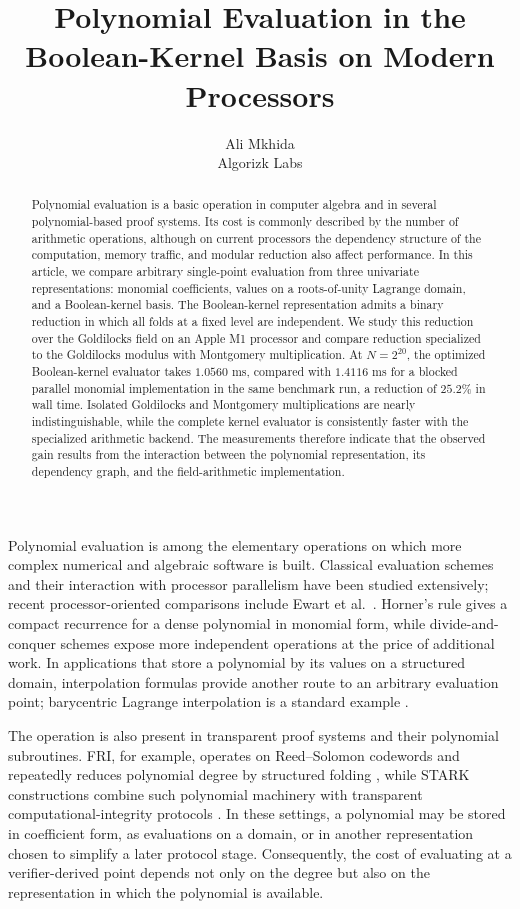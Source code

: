 \documentclass[11pt]{article}
\title{Polynomial Evaluation in the Boolean-Kernel Basis on Modern Processors}
\author{Ali Mkhida\\Algorizk Labs}
\date{}
\begin{document}
\maketitle

\begin{abstract}
Polynomial evaluation is a basic operation in computer algebra and in
several polynomial-based proof systems.  Its cost is commonly described by
the number of arithmetic operations, although on current processors the
dependency structure of the computation, memory traffic, and modular
reduction also affect performance.  In this article, we compare arbitrary
single-point evaluation from three univariate representations: monomial
coefficients, values on a roots-of-unity Lagrange domain, and a
Boolean-kernel basis.  The Boolean-kernel representation admits a binary
reduction in which all folds at a fixed level are independent.  We study
this reduction over the Goldilocks field on an Apple M1 processor and
compare reduction specialized to the Goldilocks modulus with Montgomery
multiplication.  At \(N=2^{20}\), the optimized Boolean-kernel evaluator
takes \(1.0560\) ms, compared with \(1.4116\) ms for a blocked parallel
monomial implementation in the same benchmark run, a reduction of
\(25.2\%\) in wall time.  Isolated Goldilocks and Montgomery
multiplications are nearly indistinguishable, while the complete kernel
evaluator is consistently faster with the specialized arithmetic backend.
The measurements therefore indicate that the observed gain results from
the interaction between the polynomial representation, its dependency
graph, and the field-arithmetic implementation.
\end{abstract}

Polynomial evaluation is among the elementary operations on which more
complex numerical and algebraic software is built.  Classical evaluation
schemes and their interaction with processor parallelism have been studied
extensively; recent processor-oriented comparisons include
Ewart et al.~\cite{ewart2020}.  Horner's rule gives a compact recurrence for
a dense polynomial in monomial form, while divide-and-conquer schemes
expose more independent operations at the price of additional work.  In
applications that store a polynomial by its values on a structured domain,
interpolation formulas provide another route to an arbitrary evaluation
point; barycentric Lagrange interpolation is a standard example
\cite{berrut2004}.

The operation is also present in transparent proof systems and their
polynomial subroutines.  FRI, for example, operates on Reed--Solomon codewords
and repeatedly reduces polynomial degree by structured folding
\cite{fri2018}, while STARK constructions combine such polynomial machinery
with transparent computational-integrity protocols \cite{stark2018}.  In
these settings, a polynomial may be stored in coefficient form, as
evaluations on a domain, or in another representation chosen to simplify a
later protocol stage.  Consequently, the cost of evaluating at a
verifier-derived point depends not only on the degree but also on the
representation in which the polynomial is available.
\end{document}
